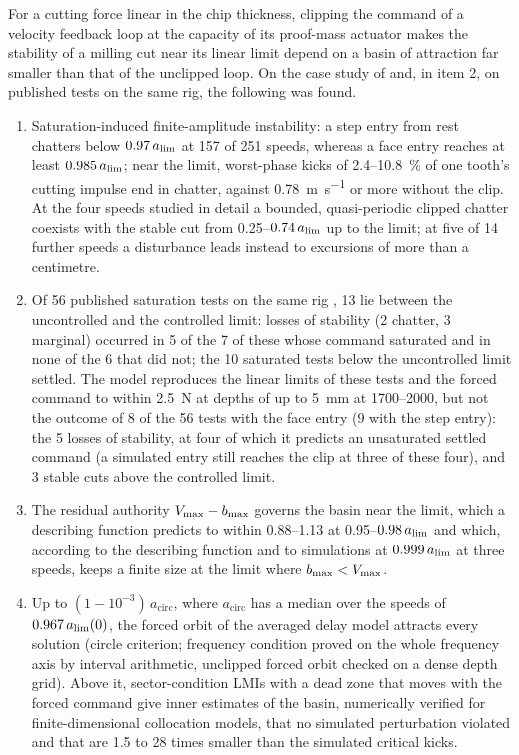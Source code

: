For a cutting force linear in the chip thickness, clipping the command of a velocity feedback loop at the capacity of its proof-mass actuator makes the stability of a milling cut near its linear limit depend on a basin of attraction far smaller than that of the unclipped loop. On the case study of \citet{ozsoy2026robust} and, in item 2, on published tests on the same rig, the following was found.
\begin{enumerate}
\item Saturation-induced finite-amplitude instability: a step entry from rest chatters below $0.97\,a_{\lim}$ at 157 of 251 speeds, whereas a face entry reaches at least $0.985\,a_{\lim}$; near the limit, worst-phase kicks of 2.4--\SI{10.8}{\percent} of one tooth's cutting impulse end in chatter, against \SI{0.78}{\metre\per\second} or more without the clip. At the four speeds studied in detail a bounded, quasi-periodic clipped chatter coexists with the stable cut from 0.25--$0.74\,a_{\lim}$ up to the limit; at five of 14 further speeds a disturbance leads instead to excursions of more than a centimetre.
\item Of 56 published saturation tests on the same rig \citep{ozsoy2025frequency}, 13 lie between the uncontrolled and the controlled limit: losses of stability (2 chatter, 3 marginal) occurred in 5 of the 7 of these whose command saturated and in none of the 6 that did not; the 10 saturated tests below the uncontrolled limit settled. The model reproduces the linear limits of these tests and the forced command to within \SI{2.5}{\newton} at depths of up to \SI{5}{\milli\metre} at 1700--\SI{2000}{\rpm}, but not the outcome of 8 of the 56 tests with the face entry (9 with the step entry): the 5 losses of stability, at four of which it predicts an unsaturated settled command (a simulated entry still reaches the clip at three of these four), and 3 stable cuts above the controlled limit.
\item The residual authority $V_{\max}-b_{\max}$ governs the basin near the limit, which a describing function predicts to within 0.88--1.13 at 0.95--$0.98\,a_{\lim}$ and which, according to the describing function and to simulations at $0.999\,a_{\lim}$ at three speeds, keeps a finite size at the limit where $b_{\max}<V_{\max}$.
\item Up to $(1-10^{-3})\,a_{\mathrm{circ}}$, where $a_{\mathrm{circ}}$ has a median over the speeds of $0.967\,a_{\lim}(0)$, the forced orbit of the averaged delay model attracts every solution (circle criterion; frequency condition proved on the whole frequency axis by interval arithmetic, unclipped forced orbit checked on a dense depth grid). Above it, sector-condition LMIs with a dead zone that moves with the forced command give inner estimates of the basin, numerically verified for finite-dimensional collocation models, that no simulated perturbation violated and that are 1.5 to 28 times smaller than the simulated critical kicks.

\end{enumerate}
